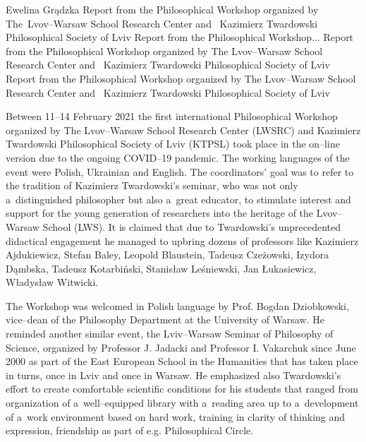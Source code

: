 \begin{editorialeng}{Ewelina Grądzka}
	{Report from the Philosophical Workshop organized by The~Lvov--Warsaw School Research Center and ~Kazimierz Twardowski Philosophical Society of Lviv}
	{Report from the Philosophical Workshop$\ldots$}
	{Report from the Philosophical Workshop organized by The Lvov--Warsaw School Research Center and ~Kazimierz Twardowski Philosophical Society of Lviv}
	{Report from the Philosophical Workshop organized by The Lvov--Warsaw School Research Center and ~Kazimierz Twardowski Philosophical Society of Lviv}



Between 11--14 February 2021 the first international Philosophical Workshop organized by The Lvov--Warsaw School Research Center (LWSRC) and Kazimierz Twardowski Philosophical Society of Lviv (KTPSL) took place in the on--line version due to the ongoing COVID--19 pandemic. The working languages of the event were Polish, Ukrainian and English. The coordinators’ goal was to refer to the tradition of Kazimierz Twardowski’s seminar, who was not only a~distinguished philosopher but also a~great educator, to stimulate interest and support for the young generation of researchers into the heritage of the Lvov--Warsaw School (LWS). It is claimed that due to Twardowski’s unprecedented didactical engagement he managed to upbring dozens of professors like Kazimierz Ajdukiewicz, Stefan Baley, Leopold Blaustein, Tadeusz Czeżowski, Izydora Dąmbska, Tadeusz Kotarbiński, Stanisław Leśniewski, Jan Łukasiewicz, Władysław Witwicki.

The Workshop was welcomed in Polish language by Prof. Bogdan Dziobkowski, vice--dean of the Philosophy Department at the University of Warsaw. He reminded another similar event, the Lviv--Warsaw Seminar of Philosophy of Science, organized by Professor J. Jadacki and Professor I. Vakarchuk since June 2000 as part of the East European School in the Humanities that has taken place in turns, once in Lviv and once in Warsaw. He emphasized also Twardowski’s effort to create comfortable scientific conditions for his students that ranged from organization of a~well--equipped library with a~reading area up to a~development of a~work environment based on hard work, training in clarity of thinking and expression, friendship as part of e.g. Philosophical Circle.


\end{editorialeng}
